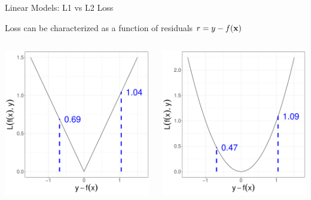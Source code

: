\documentclass[11pt,compress,t,notes=noshow, xcolor=table]{beamer}
\begin{document}
\begin{vbframe}{Linear Models: L1 vs L2 Loss}

\small Loss can be characterized as a function of residuals \textbf{$r = y - f(\mathbf{x})$}

\begin{columns}  
\begin{column}{0.4\textwidth} 
\begin{center}
  \includegraphics[width = \textwidth]{slides/supervised-regression/figure/nutshell-regression-L1.pdf}
\end{center}
\end{column}
\begin{column}{0.4\textwidth} 
\begin{center}
  \includegraphics[width = \textwidth]{slides/supervised-regression/figure/nutshell-regression-L2.pdf}

\end{center}
\end{column}
\end{columns}
\end{vbframe}
\end{document}
